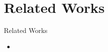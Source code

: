 \section{Related Works}

\begin{frame}{Related Works}
    \begin{itemize}
        \item 
    \end{itemize}
\end{frame}
